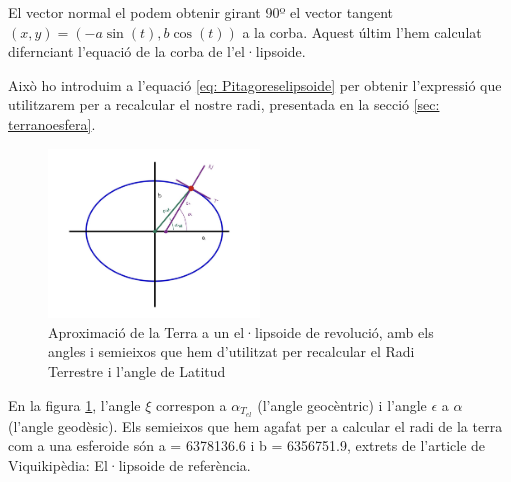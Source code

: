 \documentclass[11pt]{article}
\begin{document}
El vector normal el podem obtenir girant 90º el vector tangent $(x,y) = (-a\sin(t),b\cos(t))$ a la corba. Aquest últim l'hem calculat difernciant l'equació de la corba de l'el·lipsoide.

Això ho introduim a l'equació \eqref{eq: Pitagoreselipsoide} per obtenir l'expressió que utilitzarem per a recalcular el nostre radi, presentada en la secció \ref{sec: terranoesfera}.

\begin{figure}[H]
    \centering
    \includegraphics[width=0.5\textwidth]{Terraelipsoide.jpg}
    \caption{Aproximació de la Terra a un el·lipsoide de revolució, amb els angles i semieixos que hem d'utilitzat per recalcular el Radi Terrestre i l'angle de Latitud}
    \label{fig:terraelipsoide}
\end{figure}

En la figura \ref{fig:terraelipsoide}, l'angle $\xi$ correspon a $\alpha_{T_{el}}$ (l'angle geocèntric) i l'angle $\epsilon$ a $\alpha$ (l'angle geodèsic). Els semieixos que hem agafat per a calcular el radi de la terra com a una esferoide són a = 6378136.6 i b = 6356751.9, extrets de l'article de Viquikipèdia: El·lipsoide de referència.

\end{document}

